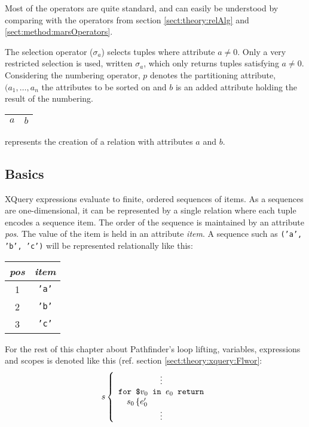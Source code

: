 Most of the operators are quite standard, and can easily be understood by comparing with the operators from
section \ref{sect:theory:relAlg} and \ref{sect:method:marsOperators}.

The selection operator ($\sigma_{a}$) selects tuples where attribute $a \ne 0$. Only a very restricted selection
is used, written $\sigma_{a}$, which only returns tuples satisfying $a \neq 0$.  Considering the numbering
operator, $p$ denotes the partitioning attribute, $(a_{1},\ldots,a_{n}$ the attributes to be sorted on and $b$ is
an added attribute holding the result of the
numbering. {\scriptsize{\begin{tabular}{c|c}$a$&$b$\\\hline\end{tabular}}}  represents the creation
of a relation with attributes $a$ and $b$.


\subsection{Basics}
\label{sect:translation:ll:Basics}
XQuery expressions evaluate to finite, ordered sequences of items. As a sequences are one-dimensional, it can be
represented by a single relation where each tuple encodes a sequence item. The order of the sequence is
maintained by an attribute \textit{pos}. The value of the item is held in an attribute \textit{item}. A sequence
such as \texttt{('a', 'b', 'c')} will be represented relationally like this:

\begin{center}
\begin{tabular}{|c|c|}\hline
\textit{pos}	& \textit{item} 	\\ \hline
1				& \texttt{'a'}		\\ \hline
2				& \texttt{'b'}		\\ \hline
3				& \texttt{'c'}		\\ \hline
\end{tabular}
\end{center}

For the rest of this chapter about Pathfinder's loop lifting, variables, expressions and scopes is denoted like
this (ref. section \ref{sect:theory:xquery:Flwor}:
\[
s \left\{
\begin{array}{l}
\qquad \qquad \quad \vdots \\
\mbox{\texttt{for \$}}v_{0}\mbox{\texttt{ in }} e_{0} \mbox{\texttt{ return}} \\
\quad s_{0} \left\{ e_{0}' \right. \\
\qquad \qquad \quad \vdots
\end{array}
\right.
\]

